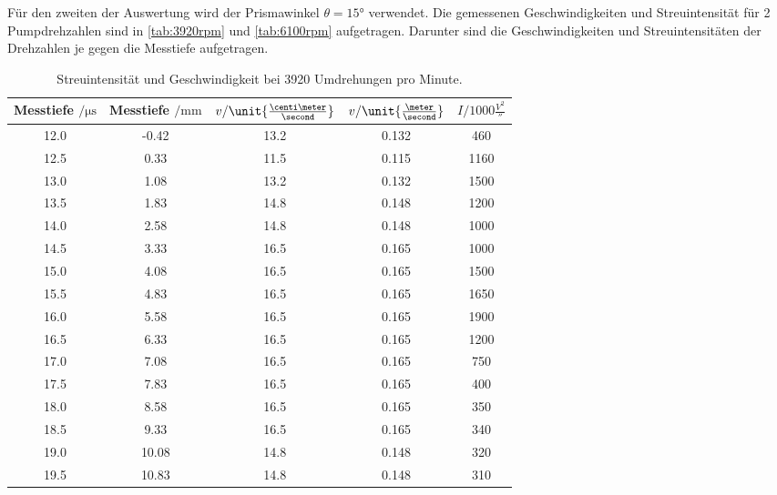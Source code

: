 Für den zweiten der Auswertung wird der Prismawinkel $\theta =15°$ verwendet. Die gemessenen Geschwindigkeiten und Streuintensität für 2 Pumpdrehzahlen sind in \autoref{tab:3920rpm} und \autoref{tab:6100rpm} aufgetragen.
Darunter sind die Geschwindigkeiten und Streuintensitäten der Drehzahlen je gegen die Messtiefe aufgetragen.
 \begin{table}
     \centering
     \caption{Streuintensität und Geschwindigkeit bei 3920 Umdrehungen pro Minute.}
     \begin{tabular}{c c c c c}
         \toprule
         Messtiefe $ \mathrm{/} \unit{\micro \second}$ &  Messtiefe $ \mathrm{/} \unit{\milli \meter}$ & $v \mathrm{/} \unit{\frac{\centi \meter}{\second}}$ & $v \mathrm{/} \unit{\frac{\meter}{\second}}$ & $I \mathrm{/} 1000\unit{\frac{V^2}{\second}}$\\
         \midrule
         12.0 &  -0.42 &  13.2 &  0.132 &  460\\
         12.5 &  0.33 &  11.5 &  0.115 &  1160\\
         13.0 &  1.08 &  13.2 &  0.132 &  1500\\
         13.5 &  1.83 &  14.8 &  0.148 &  1200\\
         14.0 &  2.58 &  14.8 &  0.148 &  1000\\
         14.5 &  3.33 &  16.5 &  0.165 &  1000\\
         15.0 &  4.08 &  16.5 &  0.165 &  1500\\
         15.5 &  4.83 &  16.5 &  0.165 &  1650\\
         16.0 &  5.58 &  16.5 &  0.165 &  1900\\
         16.5 &  6.33 &  16.5 &  0.165 &  1200\\
         17.0 &  7.08 &  16.5 &  0.165 &  750\\
         17.5 &  7.83 &  16.5 &  0.165 &  400\\
         18.0 &  8.58 &  16.5 &  0.165 &  350\\
         18.5 &  9.33 &  16.5 &  0.165 &  340\\
         19.0 &  10.08 &  14.8 &  0.148 &  320\\
         19.5 &  10.83 &  14.8 &  0.148 &  310\\
         \bottomrule
     \end{tabular}
     \label{tab:3920rpm}
\end{table}
